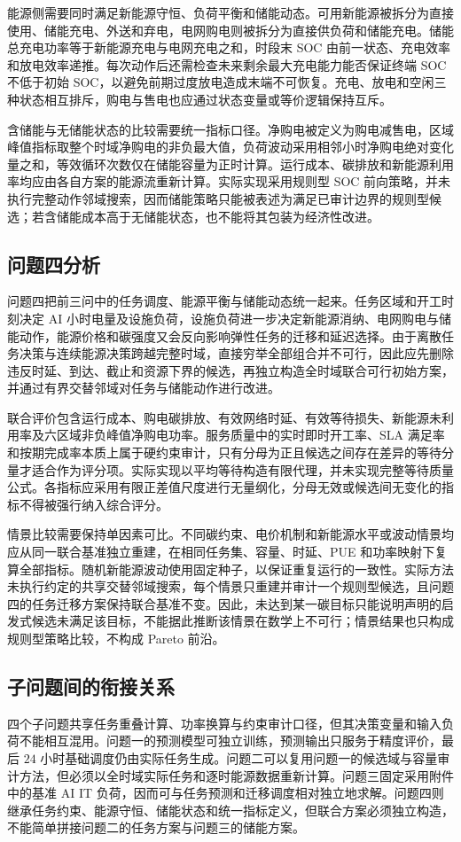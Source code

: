 能源侧需要同时满足新能源守恒、负荷平衡和储能动态。可用新能源被拆分为直接使用、储能充电、外送和弃电，电网购电则被拆分为直接供负荷和储能充电。储能总充电功率等于新能源充电与电网充电之和，时段末 SOC 由前一状态、充电效率和放电效率递推。每次动作后还需检查未来剩余最大充电能力能否保证终端 SOC 不低于初始 SOC，以避免前期过度放电造成末端不可恢复。充电、放电和空闲三种状态相互排斥，购电与售电也应通过状态变量或等价逻辑保持互斥。

含储能与无储能状态的比较需要统一指标口径。净购电被定义为购电减售电，区域峰值指标取整个时域净购电的非负最大值，负荷波动采用相邻小时净购电绝对变化量之和，等效循环次数仅在储能容量为正时计算。运行成本、碳排放和新能源利用率均应由各自方案的能源流重新计算。实际实现采用规则型 SOC 前向策略，并未执行完整动作邻域搜索，因而储能策略只能被表述为满足已审计边界的规则型候选；若含储能成本高于无储能状态，也不能将其包装为经济性改进。

\subsection{问题四分析}

问题四把前三问中的任务调度、能源平衡与储能动态统一起来。任务区域和开工时刻决定 AI 小时电量及设施负荷，设施负荷进一步决定新能源消纳、电网购电与储能动作，能源价格和碳强度又会反向影响弹性任务的迁移和延迟选择。由于离散任务决策与连续能源决策跨越完整时域，直接穷举全部组合并不可行，因此应先删除违反时延、到达、截止和资源下界的候选，再独立构造全时域联合可行初始方案，并通过有界交替邻域对任务与储能动作进行改进。

联合评价包含运行成本、购电碳排放、有效网络时延、有效等待损失、新能源未利用率及六区域非负峰值净购电功率。服务质量中的实时即时开工率、SLA 满足率和按期完成率本质上属于硬约束审计，只有分母为正且候选之间存在差异的等待分量才适合作为评分项。实际实现以平均等待构造有限代理，并未实现完整等待质量公式。各指标应采用有限正差值尺度进行无量纲化，分母无效或候选间无变化的指标不得被强行纳入综合评分。

情景比较需要保持单因素可比。不同碳约束、电价机制和新能源水平或波动情景均应从同一联合基准独立重建，在相同任务集、容量、时延、PUE 和功率映射下复算全部指标。随机新能源波动使用固定种子，以保证重复运行的一致性。实际方法未执行约定的共享交替邻域搜索，每个情景只重建并审计一个规则型候选，且问题四的任务迁移方案保持联合基准不变。因此，未达到某一碳目标只能说明声明的启发式候选未满足该目标，不能据此推断该情景在数学上不可行；情景结果也只构成规则型策略比较，不构成 Pareto 前沿。

\subsection{子问题间的衔接关系}

四个子问题共享任务重叠计算、功率换算与约束审计口径，但其决策变量和输入负荷不能相互混用。问题一的预测模型可独立训练，预测输出只服务于精度评价，最后 $24$ 小时基础调度仍由实际任务生成。问题二可以复用问题一的候选域与容量审计方法，但必须以全时域实际任务和逐时能源数据重新计算。问题三固定采用附件中的基准 AI IT 负荷，因而可与任务预测和迁移调度相对独立地求解。问题四则继承任务约束、能源守恒、储能状态和统一指标定义，但联合方案必须独立构造，不能简单拼接问题二的任务方案与问题三的储能方案。
